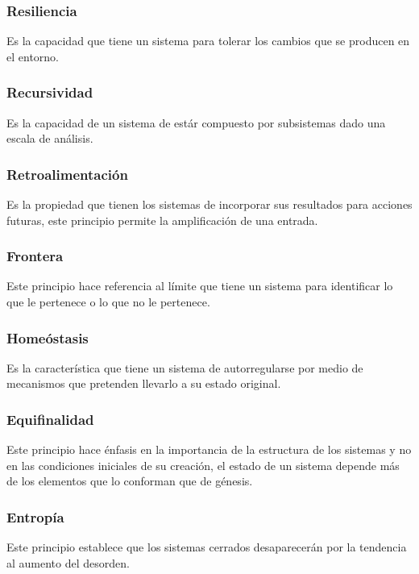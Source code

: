 \documentclass[a4paper,man,natbib]{apa6}
\begin{document}
\subsubsection{Resiliencia}
Es la capacidad que tiene un sistema para tolerar los cambios que se producen en el entorno.

\subsubsection{Recursividad}
Es la capacidad de un sistema de estár compuesto por subsistemas dado una escala de análisis. \citep{10.2307/j.ctv1228hsw}

\subsubsection{Retroalimentación}
Es la propiedad que tienen los sistemas de incorporar sus resultados para acciones futuras, este principio permite la amplificación de una entrada. \citep{10.2307/j.ctv1228hsw}

\subsubsection{Frontera}
Este principio hace referencia al límite que tiene un sistema para identificar lo que le pertenece o lo que no le pertenece.

\subsubsection{Homeóstasis}
Es la característica que tiene un sistema de autorregularse por medio de mecanismos que pretenden llevarlo a su estado original. \citep{10.2307/j.ctv1228hsw}

\subsubsection{Equifinalidad}
Este principio hace énfasis en la importancia de la estructura de los sistemas y no en las condiciones iniciales de su creación, el estado de un sistema depende más de los elementos que lo conforman que de génesis. \citep{ossa}

\subsubsection{Entropía}
Este principio establece que los sistemas cerrados desaparecerán por la tendencia al aumento del desorden. \citep{10.2307/j.ctv1228hsw}
\end{document}
